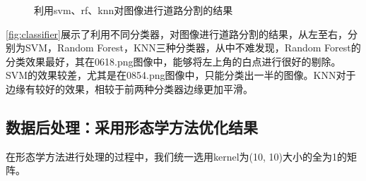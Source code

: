 \documentclass[12pt,hyperref,a4paper,UTF8]{ctexart}
\begin{document}
{\begin{figure}[!h]
	\caption{利用svm、rf、knn对图像进行道路分割的结果}
	\label{fig:classifier}
\end{figure}


\par
\autoref{fig:classifier}展示了利用不同分类器，对图像进行道路分割的结果，从左至右，分别为SVM，Random Forest，KNN三种分类器，从中不难发现，Random Forest的分类效果最好，其在0618.png图像中，能够将左上角的白点进行很好的剔除。SVM的效果较差，尤其是在0854.png图像中，只能分类出一半的图像。KNN对于边缘有较好的效果，相较于前两种分类器边缘更加平滑。


\subsection{数据后处理：采用形态学方法优化结果}

在形态学方法进行处理的过程中，我们统一选用kernel为(10, 10)大小的全为1的矩阵。
\begin{figure}[!h]
	\centering


\end{figure}}
\end{document}
